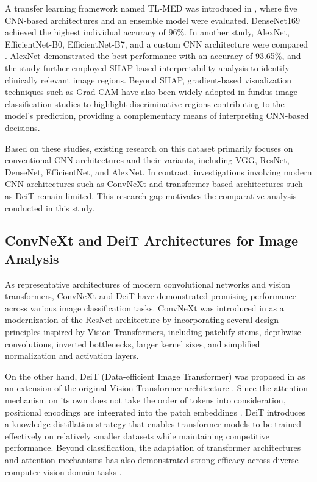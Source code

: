 A transfer learning framework named TL-MED was introduced in \cite{jibon2025}, where five CNN-based architectures and an ensemble model were evaluated.
DenseNet169 achieved the highest individual accuracy of 96\%.
In another study, AlexNet, EfficientNet-B0, EfficientNet-B7, and a custom CNN architecture were compared \cite{elkenawy2026}.
AlexNet demonstrated the best performance with an accuracy of 93.65\%, and the study further employed SHAP-based interpretability analysis to identify clinically relevant image regions.
Beyond SHAP, gradient-based visualization techniques such as Grad-CAM \cite{Selvaraju2017} have also been widely adopted in fundus image classification studies to highlight discriminative regions contributing to the model's prediction, providing a complementary means of interpreting CNN-based decisions.

Based on these studies, existing research on this dataset primarily focuses on conventional CNN architectures and their variants, including VGG, ResNet, DenseNet, EfficientNet, and AlexNet.
In contrast, investigations involving modern CNN architectures such as ConvNeXt and transformer-based architectures such as DeiT remain limited.
This research gap motivates the comparative analysis conducted in this study.

\subsection{ConvNeXt and DeiT Architectures for Image Analysis}

As representative architectures of modern convolutional networks and vision transformers, ConvNeXt and DeiT have demonstrated promising performance across various image classification tasks.
ConvNeXt was introduced in \cite{Liu2022} as a modernization of the ResNet architecture by incorporating several design principles inspired by Vision Transformers, including patchify stems, depthwise convolutions, inverted bottlenecks, larger kernel sizes, and simplified normalization and activation layers.

On the other hand, DeiT (Data-efficient Image Transformer) was proposed in \cite{touvron2021trainingdataefficientimagetransformers} as an extension of the original Vision Transformer architecture \cite{dosovitskiy2021imageworth16x16words}.
Since the attention mechanism on its own does not take the order of tokens into consideration, positional encodings are integrated into the patch embeddings \cite{ZoltnVarga2024}.
DeiT introduces a knowledge distillation strategy that enables transformer models to be trained effectively on relatively smaller datasets while maintaining competitive performance.
Beyond classification, the adaptation of transformer architectures and attention mechanisms has also demonstrated strong efficacy across diverse computer vision domain tasks \cite{Pina2025}.


